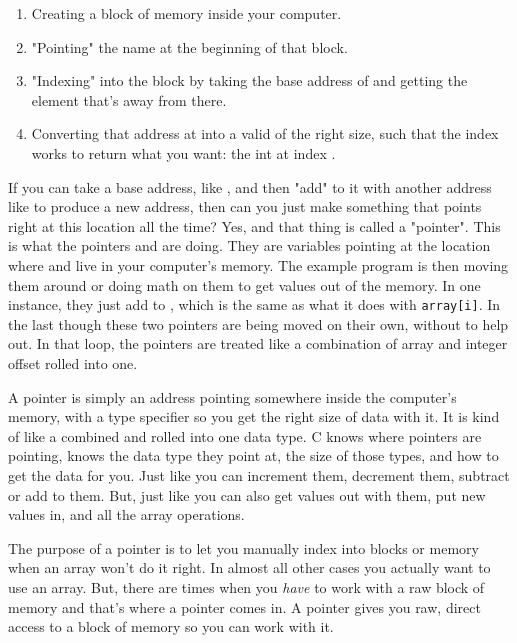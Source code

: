 \begin{enumerate}
\item Creating a block of memory inside your computer.
\item "Pointing" the name  at the beginning of that block.
\item "Indexing" into the block by taking the base address of  and 
    getting the element that's  away from there.
\item Converting that address at  into a valid  of
    the right size, such that the index works to return what you want: the int at 
    index .
\end{enumerate}

If you can take a base address, like , and then "add" to it with
another address like  to produce a new address, then can you just make
something that points right at this location all the time?  Yes, and that thing
is called a "pointer".  This is what the pointers  and
 are doing. They are variables pointing at the location where
 and  live in your computer's memory.  The example
program is then moving them around or doing math on them to get values out of
the memory.  In one instance, they just add  to ,
which is the same as what it does with \verb|array[i]|. In the last
 though these two pointers are being moved on their own, without
 to help out.  In that loop, the pointers are treated like a combination
of array and integer offset rolled into one.

A pointer is simply an address pointing somewhere inside the computer's memory,
with a type specifier so you get the right size of data with it.  It is kind of
like a combined  and  rolled into one data type.  C knows
where pointers are pointing, knows the data type they point at, the size of
those types, and how to get the data for you.  Just like  you can
increment them, decrement them, subtract or add to them.  But, just like
 you can also get values out with them, put new values in, and all
the array operations. 

The purpose of a pointer is to let you manually index into blocks or memory
when an array won't do it right.  In almost all other cases you actually
want to use an array.  But, there are times when you \emph{have} to work
with a raw block of memory and that's where a pointer comes in.  A pointer
gives you raw, direct access to a block of memory so you can work with it.

